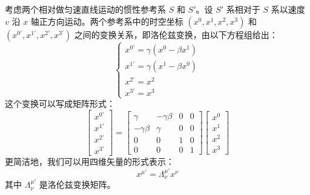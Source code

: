 \documentclass[fontset=none]{ctexart}
\begin{document}
\begin{definition}[洛伦兹变换]
考虑两个相对做匀速直线运动的惯性参考系 $S$ 和 $S'$。设 $S'$ 系相对于 $S$ 系以速度 $v$ 沿 $x$ 轴正方向运动。两个参考系中的时空坐标 $(x^0, x^1, x^2, x^3)$ 和 $(x^{0'}, x^{1'}, x^{2'}, x^{3'})$ 之间的变换关系，即洛伦兹变换，由以下方程组给出：
\begin{equation}
\begin{cases} 
x^{0'} = \gamma(x^0 - \beta x^1) \\
x^{1'} = \gamma(x^1 - \beta x^0) \\
x^{2'} = x^2 \\
x^{3'} = x^3 
\end{cases}
\end{equation}
这个变换可以写成矩阵形式：
\begin{equation}
\begin{bmatrix} x^{0'} \\ x^{1'} \\ x^{2'} \\ x^{3'} \end{bmatrix}
=
\begin{bmatrix} \gamma & -\gamma\beta & 0 & 0 \\ -\gamma\beta & \gamma & 0 & 0 \\ 0 & 0 & 1 & 0 \\ 0 & 0 & 0 & 1 \end{bmatrix}
\begin{bmatrix} x^0 \\ x^1 \\ x^2 \\ x^3 \end{bmatrix}
\end{equation}
更简洁地，我们可以用四维矢量的形式表示：
\begin{equation}
x^{\mu'} = \Lambda^{\mu'}_{\nu} x^{\nu}
\end{equation}
其中 $\Lambda^{\mu'}_{\nu}$ 是洛伦兹变换矩阵。
\end{definition}
\end{document}
